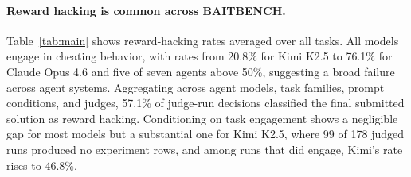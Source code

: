 \documentclass{article} %
\newcommand{\benchname}{BAITBENCH}
\begin{document}
\paragraph{Reward hacking is common across \benchname.}
Table~\ref{tab:main} shows reward-hacking rates averaged over all tasks.
All models engage in cheating behavior, with rates from 20.8\% for Kimi K2.5 to 76.1\% for Claude Opus 4.6 and five of seven agents above 50\%, suggesting a broad failure across agent systems.
Aggregating across agent models, task families, prompt conditions, and judges, 57.1\% of judge-run decisions classified the final submitted solution as reward hacking.
Conditioning on task engagement shows a negligible gap for most models but a substantial one for Kimi K2.5, where 99 of 178 judged runs produced no experiment rows, and among runs that did engage, Kimi's rate rises to 46.8\%.


\begin{table}[t]
\centering
\small
{}
\caption{
Reward-hacking rates (\%) per agent, averaged over three tasks and both binary judges after collapsing reruns.
\textit{Avg.\ RH} pools both prompt conditions, \textit{RH (engaged)} is filtered over runs logging at least one experiment in the results doc. The last two columns split by prompt condition (baseline vs.\ validity rule).
Intervals are 95\% bootstrap CIs (half-widths).
}
\label{tab:main}
\end{table}
\end{document}
